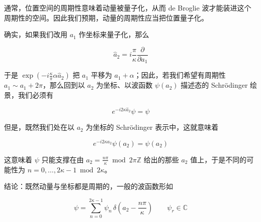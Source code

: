 通常，位置空间的周期性意味着动量被量子化，从而 de Broglie 波才能装进这个周期性的空间。因此我们预期，动量的周期性应当把位置量子化。

确实，如果我们改用 $a_1$ 作坐标来量子化，那么

\begin{equation}
  \hat a_2=i\frac{\pi}{\kappa}\frac{\partial}{\partial a_1}
  \tag{2.145}
  \label{eq:2.145}
\end{equation}

于是 $\exp(-i\frac{\kappa}{\pi}\alpha\hat a_2)$ 把 $a_1$ 平移为 $a_1+\alpha$；因此，若我们希望有周期性 $a_1\sim a_1+2\pi$，那么回到以 $a_2$ 为坐标、以波函数 $\psi(a_2)$ 描述态的 Schrödinger 绘景，我们必须有

\begin{equation}
  e^{-i2\kappa\hat a_2}\psi=\psi
  \tag{2.146}
  \label{eq:2.146}
\end{equation}

但是，既然我们处在以 $a_2$ 为坐标的 Schrödinger 表示中，这就意味着

\begin{equation}
  e^{-i2\kappa a_2}\psi(a_2)=\psi(a_2)
  \tag{2.147}
  \label{eq:2.147}
\end{equation}

这意味着 $\psi$ 只能支撑在由 $a_2=\frac{n\pi}{\kappa}\bmod 2\pi\mathbb{Z}$ 给出的那些 $a_2$ 值上，于是不同的可能性为 $n=0,\dots,2\kappa-1 \bmod 2\kappa$。

结论：既然动量与坐标都是周期的，一般的波函数形如

\begin{equation}
  \psi=\sum_{n=0}^{2\kappa-1}\psi_n\,\delta\left(a_2-\frac{n\pi}{\kappa}\right)
  \qquad \psi_r\in\mathbb{C}
  \tag{2.148}
  \label{eq:2.148}
\end{equation}


